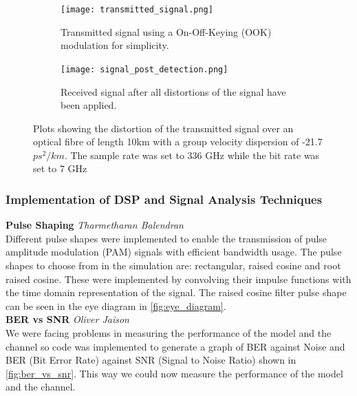     \begin{figure}[H]
		\begin{subfigure}{0.5\textwidth}
			\centering
			\texttt{[image: transmitted\_signal.png]}
			\caption{Transmitted signal using a On-Off-Keying (OOK) modulation for simplicity.}
			\label{fig:transmitted_signal}	
		\end{subfigure}
		\begin{subfigure}{0.5\textwidth}
			\centering
			\texttt{[image: signal\_post\_detection.png]}
			\caption{Received signal after all distortions of the signal have been applied.}
			\label{fig:signal_post_detection}	
		\end{subfigure}
		\caption{Plots showing the distortion of the transmitted signal over an optical fibre of length 10km with a group velocity dispersion of -21.7 $ps^2/km$. The sample rate was set to 336 GHz while the bit rate was set to 7 GHz}
		\label{fig:optical_channel_model_signals}
	\end{figure}
    
    \subsubsection{Implementation of DSP and Signal Analysis Techniques}
    \textbf{Pulse Shaping} \hspace*{0pt}\hfill \textit{Tharmetharan Balendran}\\
    
        Different pulse shapes were implemented to enable the transmission of pulse amplitude modulation (PAM) signals with efficient bandwidth usage. The pulse shapes to choose from in the simulation are: rectangular, raised cosine and root raised cosine. These were implemented by convolving their impulse functions with the time domain representation of the signal. The raised cosine filter pulse shape can be seen in the eye diagram in \autoref{fig:eye_diagram}.
        \\
    
    \textbf{BER vs SNR} \hspace*{0pt}\hfill \textit{Oliver Jaison}\\
    
        We were facing problems in measuring the performance of the model and the channel so code was implemented to generate a graph of BER against Noise and BER (Bit Error Rate) against SNR (Signal to Noise Ratio) shown in \autoref{fig:ber_vs_snr}. This way we could now measure the performance of the model and the channel.
        \\
        
